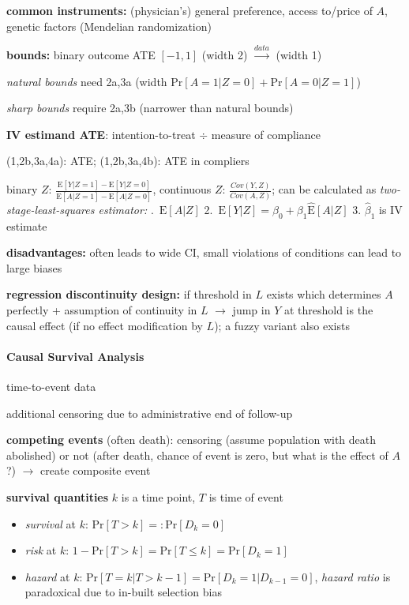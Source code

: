 \documentclass[8pt,twoside]{extarticle}
\begin{document}
\begin{multicols}{2}
 \textbf{common instruments:} (physician's) general preference, access to/price of $A$, genetic factors (Mendelian randomization)

 \textbf{bounds:} binary outcome ATE $\left[-1,1\right]$ (width 2)  $\overset{data}{\rightarrow}$ (width 1)

 \textit{natural bounds} need 2a,3a  (width $\mathrm{Pr}\left[A{=}1|Z{=}0\right] + \mathrm{Pr}\left[A{=}0|Z{=}1\right]$)

 \textit{sharp bounds} require 2a,3b (narrower than natural bounds)


 \textbf{IV estimand ATE}: intention-to-treat $\div$ measure of compliance

 (1,2b,3a,4a):  ATE;
  (1,2b,3a,4b): ATE in compliers

 binary $Z$: $\frac{\mathrm{E}\left[Y|Z=1\right] - \mathrm{E}\left[Y|Z=0\right]}{\mathrm{E}\left[A|Z=1\right] - \mathrm{E}\left[A|Z=0\right]}$, continuous $Z$: $\frac{Cov(Y,Z)}{Cov(A,Z)}$; \newline can be calculated as \textit{two-stage-least-squares estimator:} .\ $\mathrm{E}\left[A|Z\right]$ 2.\ $\mathrm{E}\left[Y|Z\right] = \beta_0 + \beta_1\hat{\mathrm{E}}\left[A|Z\right]$ 3. $\hat{\beta}_1$ is IV estimate

 \textbf{disadvantages:} often leads to wide CI, small violations of conditions can lead to large biases

 \textbf{regression discontinuity design:} if threshold in $L$ exists which determines $A$ perfectly + assumption of continuity in $L$ $\to$ jump in $Y$ at threshold is the causal effect (if no effect modification by $L$); a fuzzy variant also exists
\citep{hernan2023causal}



\paragraph{Causal Survival Analysis} time-to-event data

 additional censoring due to administrative end of follow-up

 \textbf{competing events} (often death): censoring (assume population with death abolished) or not (after death, chance of event is zero, but what is the effect of $A$?) $\rightarrow$ create composite event

 \textbf{survival quantities} $k$ is a time point, $T$ is time of event
\begin{itemize}[itemsep=0em, topsep=0pt, partopsep=0pt,parsep=0pt, leftmargin=1.5em]
\setlength{\itemsep}{0pt}%
\setlength{\parskip}{0pt}
\item \textit{survival} at $k$: $\mathrm{Pr}\left[T>k\right] =:\mathrm{Pr}\left[D_k=0\right]$
\item \textit{risk} at $k$: $1-\mathrm{Pr}\left[T>k\right] = \mathrm{Pr}\left[T \leq k\right] = \mathrm{Pr}\left[D_k=1\right]$
\item \textit{hazard} at $k$: $\mathrm{Pr}\left[T=k|T> k{-}1\right] =\mathrm{Pr}\left[D_k=1|D_{k{-}1}=0\right]$, \textit{hazard ratio} is paradoxical due to  in-built selection bias
\end{itemize}


\end{multicols}
\end{document}
